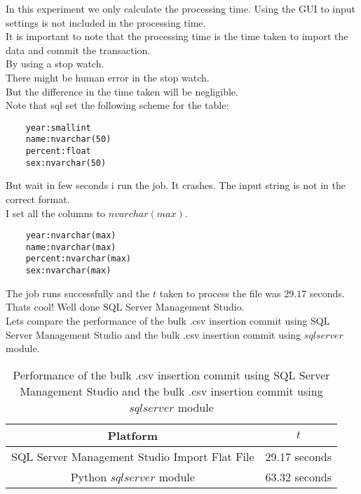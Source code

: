 In this experiment we only calculate the processing time. Using the GUI to input settings is not included in the processing time. \\
It is important to note that the processing time is the time taken to import the data and commit the transaction. \\
By using a stop watch. \\
There might be human error in the stop watch. \\
But the difference in the time taken will be negligible. \\

Note that sql set the following scheme for the table: \\
\begin{verbatim}
    year:smallint
    name:nvarchar(50)
    percent:float
    sex:nvarchar(50)
\end{verbatim}

But wait in few seconds i run the job. It crashes. The input string is not in the correct format. \\

I set all the columns to $nvarchar(max)$. \\
\begin{verbatim}
    year:nvarchar(max)
    name:nvarchar(max)
    percent:nvarchar(max)
    sex:nvarchar(max)
\end{verbatim}

The job runs successfully and the $t$ taken to process the file was $29.17$ seconds. \\
Thats cool! Well done SQL Server Management Studio. \\

Lets compare the performance of the bulk .csv insertion commit using SQL Server Management Studio and the bulk .csv insertion commit using $sqlserver$ module. \\

\begin{table}[h]
\centering
\begin{tabular}{|c|c|}
\hline
\textbf{Platform} & \textbf{$t$} \\
\hline
SQL Server Management Studio Import Flat File & 29.17 seconds \\
\hline
Python $sqlserver$ module & 63.32 seconds \\
\hline
\end{tabular}
\caption{Performance of the bulk .csv insertion commit using SQL Server Management Studio and the bulk .csv insertion commit using $sqlserver$ module}
\label{tab:performance}
\end{table}




